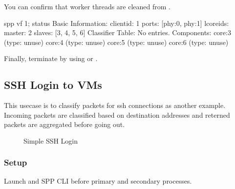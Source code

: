 \documentclass[a4paper,11pt,openany,oneside,english]{sphinxmanual}
\begin{document}
You can confirm that worker threads are cleaned from .

\begin{sphinxVerbatim}[commandchars=\\\{\},formatcom=\footnotesize]
spp \PYGZgt{} vf 1; status
Basic Information:
  \PYGZhy{} client\PYGZhy{}id: 1
  \PYGZhy{} ports: [phy:0, phy:1]
  \PYGZhy{} lcore\PYGZus{}ids:
    \PYGZhy{} master: 2
    \PYGZhy{} slaves: [3, 4, 5, 6]
Classifier Table:
  No entries.
Components:
  \PYGZhy{} core:3 \PYGZsq{}\PYGZsq{} (type: unuse)
  \PYGZhy{} core:4 \PYGZsq{}\PYGZsq{} (type: unuse)
  \PYGZhy{} core:5 \PYGZsq{}\PYGZsq{} (type: unuse)
  \PYGZhy{} core:6 \PYGZsq{}\PYGZsq{} (type: unuse)
\end{sphinxVerbatim}

Finally, terminate  by using  or .

\begin{sphinxVerbatim}[commandchars=\\\{\},formatcom=\footnotesize]
\end{sphinxVerbatim}


\subsection{SSH Login to VMs}
\label{\detokenize{usecases/spp_vf:ssh-login-to-vms}}\label{\detokenize{usecases/spp_vf:spp-usecases-vf-ssh}}
This usecase is to classify packets for ssh connections as another example.
Incoming packets are classified based on destination addresses and reterned
packets are aggregated before going out.

\begin{figure}[htbp]
\centering
\capstart

\noindent{}
\caption{Simple SSH Login}\label{\detokenize{usecases/spp_vf:id5}}\label{\detokenize{usecases/spp_vf:figure-spp-usecase-vf-ssh-overview}}\end{figure}


\subsubsection{Setup}
\label{\detokenize{usecases/spp_vf:id1}}
Launch  and SPP CLI before primary and secondary processes.
\end{document}

